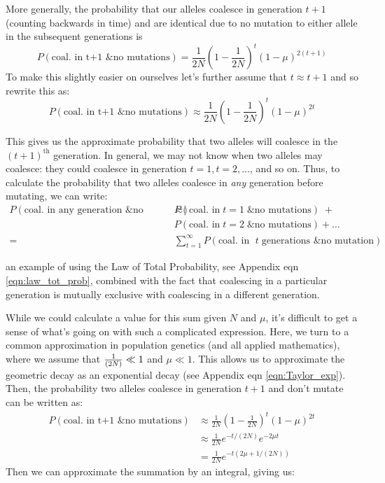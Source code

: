 More generally, the probability that our alleles coalesce in generation
$t+1$ (counting backwards in time) and are identical due to no mutation to either allele in the
subsequent generations is
%
\begin{equation}
P(\textrm{coal. in t+1 \& no mutations}) =  \frac{1}{2N} \left(1- \frac{1}{2N} \right)^t \left(1-\mu \right)^{2(t+1)}
\end{equation}
%
To make this slightly easier on ourselves let's further assume that $t
\approx t+1$ and so rewrite this as:
\begin{equation}
P(\textrm{coal. in t+1 \& no mutations}) \approx \frac{1}{2N} \left(1- \frac{1}{2N} \right)^t \left(1-\mu \right)^{2t}
\end{equation}
%

This gives us the approximate probability that two alleles will coalesce in the
$(t+1)^\text{th}$ generation. In general, we may not know when two alleles may
coalesce: they could coalesce in generation $t=1, t=2, \ldots $, and so on.
Thus, to calculate the probability that two alleles coalesce in \emph{any}
generation before mutating, we can write:
\begin{align}
  P(\textrm{coal. in any generation \& no mutations}) \approx & P(\textrm{coal. in} \; t=1 \; \textrm{\& no mutations}) \; + \nonumber\\
&  P(\textrm{coal. in} \; t=2 \; \textrm{\& no mutations}) + \ldots \nonumber\\
  = & \sum_{t=1}^\infty P(\textrm{coal. in } \; t \; \textrm{generations \& no mutation})
\end{align}

an example of using the Law of Total Probability, see Appendix eqn \eqref{eqn:law_tot_prob}, combined with the fact that coalescing in a particular generation is mutually exclusive with coalescing in a different generation.

While we could calculate a value for this sum given $N$ and $\mu$, it's
difficult to get a sense of what's going on with such a complicated expression.
Here, we turn to a common approximation in population genetics (and all applied
mathematics), where we assume that $\nicefrac{1}{(2N)} \ll 1$ and $\mu \ll 1$.
This allows us to approximate the geometric decay as an exponential decay (see Appendix eqn \eqref{eqn:Taylor_exp}).
Then, the probability two alleles coalesce in generation $t+1$ and don't mutate
can be written as:
%
\begin{align} P(\textrm{coal. in t+1 \& no mutations}) &\approx \frac{1}{2N}
\left(1- \frac{1}{2N} \right)^t \left(1-\mu \right)^{2t} \\
& \approx \frac{1}{2N} e^{-t/(2N)} e^{-2\mu t } \\
&=\frac{1}{2N} e^{-t(2\mu+1/(2N))} \end{align}
%
Then we can approximate the summation by an integral, giving us:
%


